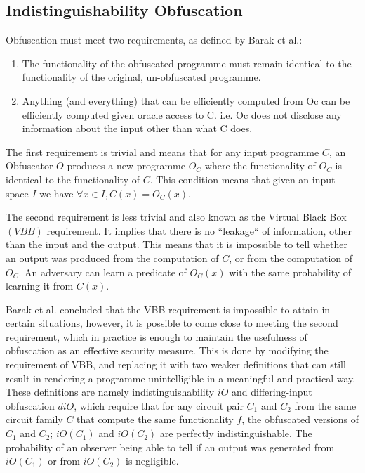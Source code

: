 \subsection{Indistinguishability Obfuscation}
Obfuscation must meet two requirements, as defined by Barak et al.\cite{barak}:
\begin{enumerate}
	\item The functionality of the obfuscated programme must remain identical to the functionality of the original, un-obfuscated programme.
	\item Anything (and everything) that can be efficiently computed from Oc can be efficiently computed given oracle access to C. i.e. Oc does not disclose any information about the input other than what C does. 
\end{enumerate}
The first requirement is trivial and means that for any input programme $C$, an Obfuscator $O$ produces a new programme $O_C$ where the functionality of $O_C$  is identical to the functionality of $C$. This condition means that given an input space $I$ we have $ \forall x \in I, C(x) = O_C(x)$.
\par
The second requirement is less trivial and also known as the Virtual Black Box $(VBB)$ requirement. It implies that there is no ``leakage`` of information, other than the input and the output. This means that it is impossible to tell whether an output was produced from the computation of $C$, or from the computation of $O_C$. An adversary can learn a predicate of $O_C(x)$ with the same probability of learning it from $C(x)$. 
\par
Barak et al. concluded that the VBB requirement is impossible to attain in certain situations\cite{barak}, however, it is possible to come close to meeting the second requirement, which in practice is enough to maintain the usefulness of obfuscation as an effective security measure. This is done by modifying the requirement of VBB, and replacing it with two weaker definitions that can still result in rendering a programme unintelligible in a meaningful and practical way. These definitions are namely indistinguishability $iO$ and differing-input obfuscation $diO$, which require that for any circuit pair $C_1$ and $C_2$ from the same circuit family $C$ that compute the same functionality $f$, the obfuscated versions of $C_1$ and $C_2$; $iO(C_1)$ and $iO(C_2)$ are perfectly indistinguishable. The probability of an observer being able to tell if an output was generated from $iO(C_1)$ or from $iO(C_2)$ is negligible.
\par
